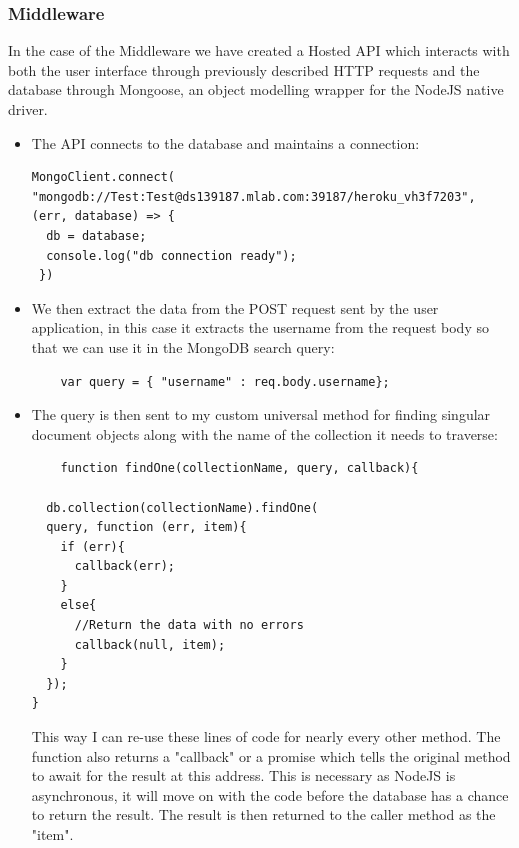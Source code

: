 \subsubsection{Middleware}
    In the case of the Middleware we have created a Hosted API which interacts with both the user interface through previously described HTTP requests and the database through Mongoose, an object modelling wrapper for the NodeJS native driver. \cite{mongoose}
\begin{itemize}


    \item The API connects to the database and maintains a connection:
\begin{verbatim}
MongoClient.connect(
"mongodb://Test:Test@ds139187.mlab.com:39187/heroku_vh3f7203",
(err, database) => {
  db = database;
  console.log("db connection ready");
 })
\end{verbatim}
    \item We then extract the data from the POST request sent by the user application, in this case it extracts the username from the request body so that we can use it in the MongoDB search query:
\begin{verbatim}
    var query = { "username" : req.body.username};
\end{verbatim}
    \item The query is then sent to my custom universal method for finding singular document objects along with the name of the collection it needs to traverse:
\begin{verbatim}
    function findOne(collectionName, query, callback){

  db.collection(collectionName).findOne(
  query, function (err, item){
    if (err){
      callback(err);
    }
    else{
      //Return the data with no errors
      callback(null, item);
    }
  });
}
\end{verbatim}
    This way I can re-use these lines of code for nearly every other method. The function also returns a "callback" or a promise which tells the original method to await for the result at this address. This is necessary as NodeJS is asynchronous, it will move on with the code before the database has a chance to return the result.
    The result is then returned to the caller method as the "item".



\end{itemize}
